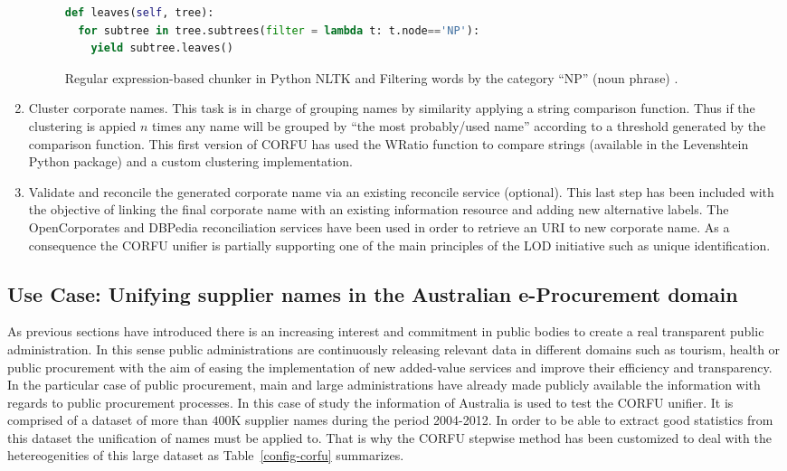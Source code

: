 \documentclass{llncs}
\begin{document}
\begin{enumerate}
\begin{figure}[!h]
\begin{center}
\begin{lstlisting}[language=Python]
def leaves(self, tree):
  for subtree in tree.subtrees(filter = lambda t: t.node=='NP'):
    yield subtree.leaves()
\end{lstlisting}
\caption{Regular expression-based chunker in Python NLTK and Filtering words by the category ``NP'' (noun phrase) .}
\label{figure:step-4}
\end{center}
\end{figure}   

\item Cluster corporate names. This task is in charge of grouping names by similarity applying 
a string comparison function. Thus if the clustering is appied $n$ times any name 
will be grouped by ``the most probably/used name'' according to a threshold generated 
by the comparison function. This first version of CORFU has used the WRatio function to 
compare strings (available in the Levenshtein Python package) and a custom clustering 
implementation.

\item Validate and reconcile the generated corporate name via an existing reconcile service (optional). This last 
step has been included with the objective of linking the final corporate name with an existing information 
resource and adding new alternative labels. The OpenCorporates and DBPedia reconciliation services have 
been used in order to retrieve an URI to new corporate name. As a consequence the CORFU unifier is partially supporting 
one of the main principles of the LOD initiative such as unique identification.
\end{enumerate}
% 
%
\subsection{Use Case: Unifying supplier names in the Australian e-Procurement domain}
As previous sections have introduced there is an increasing interest and commitment 
in public bodies to create a real transparent public administration. In this sense 
public administrations are continuously releasing relevant data in different domains 
such as tourism, health or public procurement with the aim of easing the implementation 
of new added-value services and improve their efficiency and transparency. In the particular 
case of public procurement, main and large administrations have already made publicly available the information 
with regards to public procurement processes. In this case of study the information of Australia is used 
to test the CORFU unifier. It is comprised of a dataset of more than $400$K supplier names during the period 2004-2012. In order to be able to extract 
good statistics from this dataset the unification of names must be applied to. That is why 
the CORFU stepwise method has been customized to deal with the hetereogenities of this large 
dataset as Table~\ref{config-corfu} summarizes.
\end{document}
